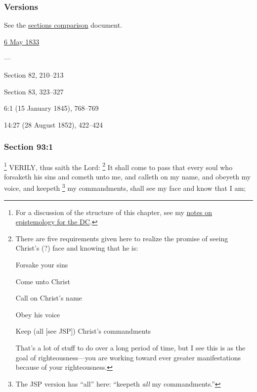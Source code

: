 	\subsubsection{Versions}
		\label{DC93-V}
		
		See the \href{https://drive.google.com/file/d/1goAvNz8jS4R8slYfMG_db55Ty2z_vmgK/view?usp=sharing}{sections comparison} document.
	
		\begin{compactdesc}
			\item[JSP] \hyperref[EMS-1833-JS-6-MAY-1833]{6 May 1833}
			\item[BC] ---
			\item[DC 1835] Section 82, 210--213
			\item[DC 1844] Section 83, 323--327
			\item[TS] 6:1 (15 January 1845), 768--769
			\item[MS] 14:27 (28 August 1852), 422--424
		\end{compactdesc}

	\subsubsection{Section 93:1} %
		\label{DC93-1}

			\footnote{%
				For a discussion of the structure of this chapter, see my \hyperref[EPIST-REVELATION-DC]{notes on epistemology for the DC}.
				}%
		VERILY, thus saith the Lord:
			\footnote{%
				There are five requirements given here to realize the promise of seeing Christ's (?) face and knowing that he is:
					\begin{compactenum}
						\item Forsake your sins
						\item Come unto Christ
						\item Call on Christ's name
						\item Obey his voice
						\item Keep (all [see JSP]) Christ's commandments
					\end{compactenum}
				That's a lot of stuff to do over a long period of time, but I see this is as the goal of righteousness---you are working toward ever greater manifestations because of your righteousness.
				}%
		It shall come to pass that every soul who forsaketh his sins and cometh unto me, and calleth on my name, and obeyeth my voice, and keepeth%
			\footnote{%
				The JSP version has ``all'' here: ``keepeth \textit{all} my commandments.''
				}
		my commandments, shall see my face and know that I am;


